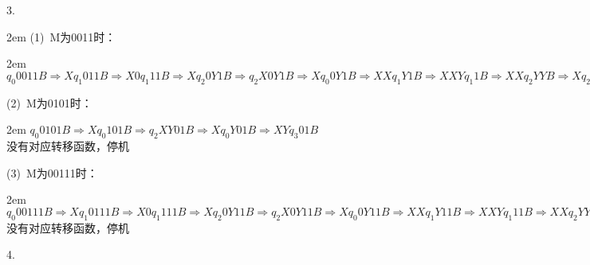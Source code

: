 \documentclass[a4paper,12pt,oneside,final,titlepage]{article}
\begin{document}
3.
\begin{adjustwidth}{2em}{}
(1)\ M为0011时：
\begin{adjustwidth}{2em}{}
$q_{0}0011B\Rightarrow Xq_{1}011B\Rightarrow X0q_{1}11B\Rightarrow Xq_{2}0Y1B\Rightarrow q_{2}X0Y1B\Rightarrow Xq_{0}0Y1B\Rightarrow XXq_{1}Y1B\Rightarrow XXYq_{1}1B\Rightarrow XXq_{2}YYB\Rightarrow Xq_{2}XYYB\Rightarrow XXq_{0}YYB\Rightarrow XXYq_{3}YB\Rightarrow XXYYq_{3}B\Rightarrow XXYYBq_{4}$
\end{adjustwidth}
(2)\ M为0101时：
\begin{adjustwidth}{2em}{}
$q_{0}0101B\Rightarrow Xq_{0}101B\Rightarrow q_{2}XY01B\Rightarrow Xq_{0}Y01B\Rightarrow XYq_{3}01B$\\
没有对应转移函数，停机
\end{adjustwidth}
(3)\ M为00111时：
\begin{adjustwidth}{2em}{}
$q_{0}00111B\Rightarrow Xq_{1}0111B\Rightarrow X0q_{1}111B\Rightarrow Xq_{2}0Y11B\Rightarrow q_{2}X0Y11B\Rightarrow Xq_{0}0Y11B\Rightarrow XXq_{1}Y11B\Rightarrow XXYq_{1}11B\Rightarrow XXq_{2}YY1B\Rightarrow Xq_{2}XYY1B\Rightarrow XXq_{0}YY1B\Rightarrow XXYq_{3}Y1B\Rightarrow XXYYq_{3}1B$\\
没有对应转移函数，停机
\end{adjustwidth}
\end{adjustwidth}
4.
\end{document}
